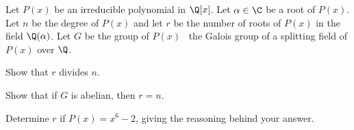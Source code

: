 Let $P(x)$ be an irreducible polynomial in $\Q[x]$. Let $\alpha\in \C$
be a root of $P(x)$. Let $n$ be the degree of $P(x)$ and let $r$ be
the number of roots of $P(x)$ in the field $\Q(\alpha)$. Let $G$ be
the group of $P(x)$ \ie\ the Galois group of a splitting field of
$P(x)$ over $\Q$.
\begin{alist}
\item Show that $r$ divides $n$.
\item Show that if $G$ is abelian, then $r=n$.
\item Determine $r$ if $P(x)=x^6-2$, giving the reasoning behind your
answer.
\end{alist}
